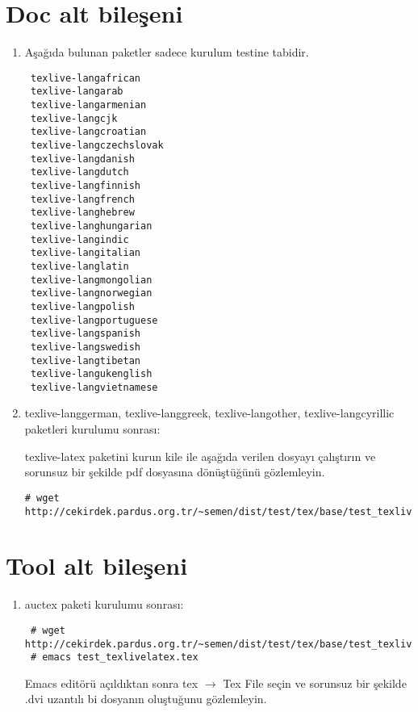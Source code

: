 \documentclass[a4paper,10pt]{article}
\begin{document}
\section{Doc alt bileşeni} 
\begin{enumerate}
 \item Aşağıda bulunan paketler sadece kurulum testine tabidir.
\begin{verbatim}
 texlive-langafrican
 texlive-langarab
 texlive-langarmenian
 texlive-langcjk
 texlive-langcroatian
 texlive-langczechslovak
 texlive-langdanish
 texlive-langdutch
 texlive-langfinnish
 texlive-langfrench
 texlive-langhebrew
 texlive-langhungarian
 texlive-langindic
 texlive-langitalian
 texlive-langlatin
 texlive-langmongolian
 texlive-langnorwegian
 texlive-langpolish
 texlive-langportuguese
 texlive-langspanish
 texlive-langswedish
 texlive-langtibetan
 texlive-langukenglish
 texlive-langvietnamese
\end{verbatim}
\item  texlive-langgerman, texlive-langgreek, texlive-langother, texlive-langcyrillic paketleri kurulumu sonrası:

texlive-latex paketini kurun kile ile aşağıda verilen dosyayı çalıştırın ve sorunsuz bir şekilde pdf dosyasına dönüştüğünü gözlemleyin.

\begin{verbatim}
# wget http://cekirdek.pardus.org.tr/~semen/dist/test/tex/base/test_texlivelatex.tex
\end{verbatim}

\end{enumerate}

\section{Tool alt bileşeni}
\begin{enumerate}
 \item auctex paketi kurulumu sonrası:
  
\begin{verbatim}
 # wget http://cekirdek.pardus.org.tr/~semen/dist/test/tex/base/test_texlivelatex.tex
 # emacs test_texlivelatex.tex 
\end{verbatim}

Emacs editörü açıldıktan sonra tex $\rightarrow$ Tex File seçin ve sorunsuz bir şekilde .dvi uzantılı bi dosyanın oluştuğunu gözlemleyin.

\end{enumerate}
\end{document}
